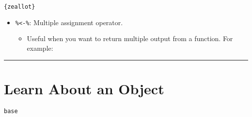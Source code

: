 \documentclass[]{book}
\newenvironment{Shaded}{\begin{snugshade}}{\end{snugshade}}
\newcommand{\ControlFlowTok}[1]{\textcolor[rgb]{0.13,0.29,0.53}{\textbf{#1}}}
\newcommand{\DataTypeTok}[1]{\textcolor[rgb]{0.13,0.29,0.53}{#1}}
\newcommand{\KeywordTok}[1]{\textcolor[rgb]{0.13,0.29,0.53}{\textbf{#1}}}
\newcommand{\NormalTok}[1]{#1}
\newcommand{\OperatorTok}[1]{\textcolor[rgb]{0.81,0.36,0.00}{\textbf{#1}}}
\newcommand{\StringTok}[1]{\textcolor[rgb]{0.31,0.60,0.02}{#1}}
\providecommand{\tightlist}{%
  \setlength{\itemsep}{0pt}\setlength{\parskip}{0pt}}
\begin{document}
\texttt{\{zeallot\}}

\begin{itemize}
\tightlist
\item
  \texttt{\%\textless{}-\%}: Multiple assignment operator.

  \begin{itemize}
  \tightlist
  \item
    Useful when you want to return multiple output from a function. For example:
  \end{itemize}
\end{itemize}

\begin{Shaded}
\end{Shaded}

\begin{center}\rule{0.5\linewidth}{\linethickness}\end{center}

\hypertarget{learn-about-an-object}{%
\section{Learn About an Object}\label{learn-about-an-object}}

\texttt{base}
\end{document}
